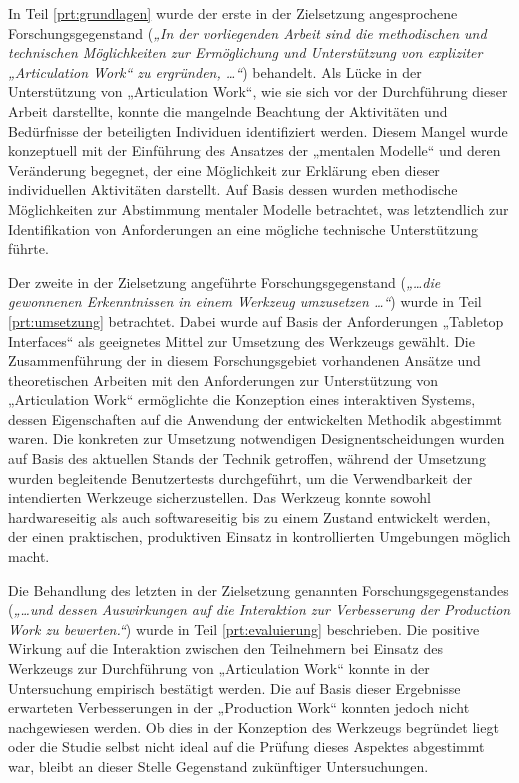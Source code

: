 In Teil \ref{prt:grundlagen} wurde der erste in der Zielsetzung angesprochene Forschungsgegenstand (\emph{„In der vorliegenden Arbeit sind die methodischen und technischen Möglichkeiten zur Ermöglichung und Unterstützung von expliziter „Articulation Work“ zu ergründen, \ldots“}) behandelt. Als Lücke in der Unterstützung von „Articulation Work“, wie sie sich vor der Durchführung dieser Arbeit darstellte, konnte die mangelnde Beachtung der Aktivitäten und Bedürfnisse der beteiligten Individuen identifiziert werden. Diesem Mangel wurde konzeptuell mit der Einführung des Ansatzes der „mentalen Modelle“ und deren Veränderung begegnet, der eine Möglichkeit zur Erklärung eben dieser individuellen Aktivitäten darstellt. Auf Basis dessen wurden methodische Möglichkeiten zur Abstimmung mentaler Modelle betrachtet, was letztendlich zur Identifikation von Anforderungen an eine mögliche technische Unterstützung führte.

Der zweite in der Zielsetzung angeführte Forschungsgegenstand (\emph{„\ldots die gewonnenen Erkenntnissen in einem Werkzeug umzusetzen \ldots“}) wurde in Teil \ref{prt:umsetzung} betrachtet. Dabei wurde auf Basis der Anforderungen  „Tabletop Interfaces“ als geeignetes Mittel zur Umsetzung des Werkzeugs gewählt. Die Zusammenführung der in diesem Forschungsgebiet vorhandenen Ansätze und theoretischen Arbeiten mit den Anforderungen zur Unterstützung von „Articulation Work“ ermöglichte die Konzeption eines interaktiven Systems, dessen Eigenschaften auf die Anwendung der entwickelten Methodik abgestimmt waren. Die konkreten zur Umsetzung notwendigen Designentscheidungen wurden auf Basis des aktuellen Stands der Technik getroffen, während der Umsetzung wurden begleitende Benutzertests durchgeführt, um die Verwendbarkeit der intendierten Werkzeuge sicherzustellen. Das Werkzeug konnte sowohl hardwareseitig als auch softwareseitig bis zu einem Zustand entwickelt werden, der einen praktischen, produktiven Einsatz in kontrollierten Umgebungen möglich macht.

Die Behandlung des letzten in der Zielsetzung genannten Forschungsgegenstandes (\emph{„\ldots und dessen Auswirkungen auf die Interaktion zur Verbesserung der Production Work zu bewerten.“}) wurde in Teil \ref{prt:evaluierung} beschrieben. Die positive Wirkung auf die Interaktion zwischen den Teilnehmern bei Einsatz des Werkzeugs zur Durchführung von „Articulation Work“ konnte in der Untersuchung empirisch bestätigt werden. Die auf Basis dieser Ergebnisse erwarteten Verbesserungen in der „Production Work“ konnten jedoch nicht nachgewiesen werden. Ob dies in der Konzeption des Werkzeugs begründet liegt oder die Studie selbst nicht ideal auf die Prüfung dieses Aspektes abgestimmt war, bleibt an dieser Stelle Gegenstand zukünftiger Untersuchungen.

